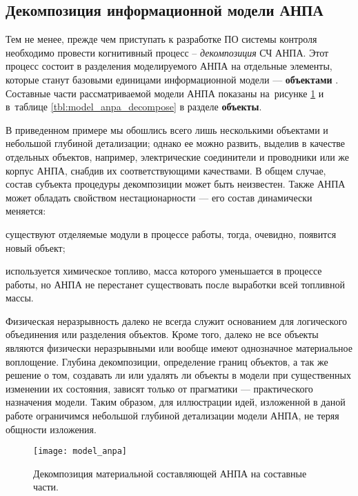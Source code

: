\clearpage
\subsection{Декомпозиция информационной модели АНПА} \label{sec:anpa_decompose}

Тем не менее, прежде чем приступать к разработке ПО системы контроля необходимо провести когнитивный процесс -- \textit{декомпозиция} СЧ АНПА.
Этот процесс состоит в разделения моделируемого АНПА на отдельные элементы, которые станут базовыми единицами информационной модели --- \textbf{объектами} \cite{journal:vestnik_igeu:elizarova}.
Составные части рассматриваемой модели АНПА показаны на~рисунке \ref{fig:model_anpa} и в~таблице \ref{tbl:model_anpa_decompose} в разделе \textbf{объекты}.

В приведенном примере мы обошлись всего лишь несколькими объектами и небольшой глубиной детализации;
однако ее можно развить, выделив в качестве отдельных объектов, например, электрические соединители и проводники
или же корпус АНПА, снабдив их соответствующими качествами.
В общем случае, состав субъекта процедуры декомпозиции может быть неизвестен.
Также АНПА может обладать свойством нестационарности --- его состав динамически меняется:
\begin{enumerate*}[label=\itshape\alph*\upshape)]
\item  существуют отделяемые модули в процессе работы, тогда, очевидно, появится новый объект;
\item используется химическое топливо, масса которого уменьшается в процессе работы,
   но АНПА не перестанет существовать после выработки всей топливной массы.
\end{enumerate*}
Физическая неразрывность далеко не всегда служит основанием для логического объединения или разделения объектов.
Кроме того, далеко не все объекты являются физически неразрывными или вообще имеют однозначное материальное воплощение.
%
Глубина декомпозиции, определение границ объектов, а так же решение о том, создавать ли или удалять ли объекты в модели
при существенных изменении их состояния, зависят только от прагматики --- практического назначения модели.
Таким образом, для иллюстрации идей, изложенной в даной работе ограничимся небольшой глубиной детализации модели АНПА,
не теряя общности изложения.

\begin{figure}[ht!]
    \begin{center}
        \texttt{[image: model\_anpa]}
        \caption[Декомпозиция материальной составляющей]
            {Декомпозиция материальной составляющей АНПА на составные части.}
                \label{fig:model_anpa}
    \end{center}
\end{figure}


